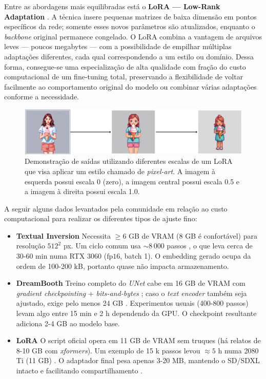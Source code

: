\documentclass[12pt, %
openright, 
oneside, %
a4paper,    %
brazil]{facom-ufu-abntex2}
\begin{document}
Entre as abordagens mais equilibradas está o \textbf{LoRA — Low-Rank Adaptation} \cite{hu2021loralowrankadaptationlarge}. A técnica insere pequenas matrizes de baixa dimensão em pontos específicos da rede; somente esses novos parâmetros são atualizados, enquanto o \emph{backbone} original permanece congelado. O LoRA combina a vantagem de arquivos leves — poucos megabytes — com a possibilidade de empilhar múltiplas adaptações diferentes, cada qual correspondendo a um estilo ou domínio. Dessa forma, consegue-se uma especialização de alta qualidade com fração do custo computacional de um fine-tuning total, preservando a flexibilidade de voltar facilmente ao comportamento original do modelo ou combinar várias adaptações conforme a necessidade.

\begin{figure}[H]
    \centering
    \includegraphics[width=\linewidth]{finetuning-2.png}
    \caption{Demonstração de saídas utilizando diferentes escalas de um LoRA que visa aplicar um estilo chamado de \textit{pixel-art}. A imagem à esquerda possui escala 0 (zero), a imagem central possui escala 0.5 e a imagem à direita possui escala 1.0.}
    \label{fig:finetuning2}
\end{figure}

A seguir alguns dados levantados pela comunidade em relação ao custo computacional para realizar os diferentes tipos de ajuste fino:
\begin{itemize}
      \item \textbf{Textual Inversion} Necessita \(\ge\!6\) GB de VRAM (8 GB é confortável) para resolução \(512^2\) px. Um ciclo comum usa \(\sim\!8\,000\) passos , o que leva cerca de 30-60 min numa RTX 3060 (\(\text{fp16}\), batch 1). O embedding gerado ocupa da ordem de 100-200 kB, portanto quase não impacta armazenamento.
      \item \textbf{DreamBooth} Treino completo do \textit{UNet} cabe em 16 GB de VRAM com \textit{gradient checkpointing} + \textit{bits-and-bytes} ; caso o \textit{text encoder} também seja ajustado, exige pelo menos 24 GB . Experimentos usuais (400-800 passos) levam algo entre 15 min e 2 h dependendo da GPU. O checkpoint resultante adiciona 2-4 GB ao modelo base.
      \item \textbf{LoRA} O script oficial opera em 11 GB de VRAM sem truques  (há relatos de 8-10 GB com \textit{xformers}). Um exemplo de 15 k passos levou \(\approx5\) h numa 2080 Ti (11 GB) . O adaptador final pesa apenas 3-20 MB, mantendo o SD/SDXL intacto e facilitando compartilhamento .
\end{itemize}
\end{document}
